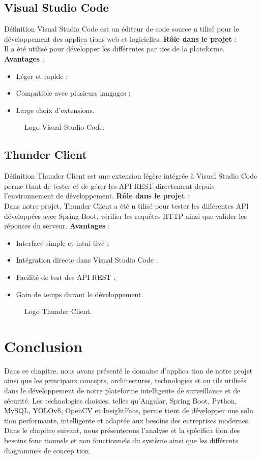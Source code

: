 \documentclass[12pt,a4paper]{report}
\numberwithin{figure}{chapter}
\numberwithin{table}{chapter}
\begin{document}
\subsection{Visual Studio Code}
Déﬁnition
Visual Studio Code est un éditeur de code source u tilisé pour le développement des applica tions web
et logicielles.
\textbf{Rôle dans le projet} : \\
Il a été utilisé pour développer les diﬀérentes par ties de la plateforme.
\textbf{Avantages} : \\
\begin{itemize}
  \item Léger et rapide ;
  \item Compatible avec plusieurs langages ;
  \item Large choix d’extensions.
\end{itemize}
\begin{figure}[H]
  \centering
  \caption{Logo Visual Studio Code.}
\end{figure}
\subsection{Thunder Client}
Déﬁnition
Thunder Client est une extension légère intégrée à Visual Studio Code perme ttant de tester et de
gérer les API REST directement depuis l’environnement de développement.
\textbf{Rôle dans le projet} : \\
Dans notre projet, Thunder Client a été u tilisé pour tester les diﬀérentes API développées avec Spring
Boot, vériﬁer les requêtes HTTP ainsi que valider les réponses du serveur.
\textbf{Avantages} : \\
\begin{itemize}
  \item Interface simple et intui tive ;
  \item Intégration directe dans Visual Studio Code ;
  \item Facilité de test des API REST ;
  \item Gain de temps durant le développement.
\end{itemize}
\begin{figure}[H]
  \centering
  \caption{Logo Thunder Client.}
\end{figure}
\section{Conclusion}
Dans ce chapitre, nous avons présenté le domaine d’applica tion de notre projet ainsi que les
principaux concepts, architectures, technologies et ou tils utilisés dans le développement de notre
plateforme intelligente de surveillance et de sécurité.
Les technologies choisies, telles qu’Angular, Spring Boot, Python, MySQL, YOLOv8, OpenCV et
InsightFace, perme ttent de développer une solu tion performante, intelligente et adaptée aux besoins
des entreprises modernes.
Dans le chapitre suivant, nous présenterons l’analyse et la spéciﬁca tion des besoins fonc tionnels et
non fonctionnels du système ainsi que les diﬀérents diagrammes de concep tion.
\end{document}
